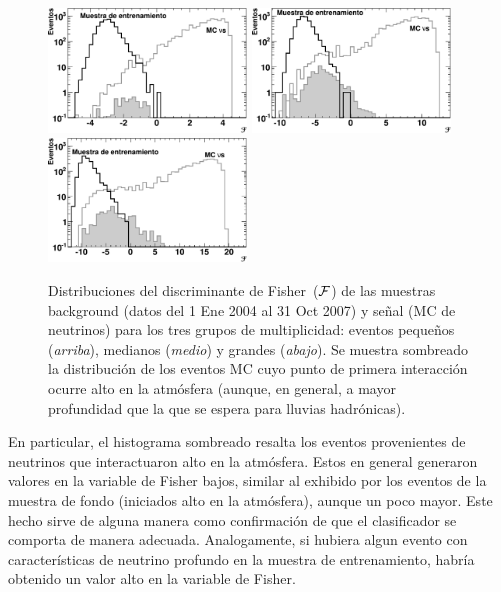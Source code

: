 	\begin{figure}
	\begin{center}
	\includegraphics [width=0.47\textwidth]{fig/seleccionAuger/fishDist_altos_1.pdf}\hfill
	\includegraphics [width=0.47\textwidth]{fig/seleccionAuger/fishDist_altos_2.pdf}\\
	\includegraphics [width=0.47\textwidth]{fig/seleccionAuger/fishDist_altos_3.pdf}
	\end{center}
	\caption{
	Distribuciones del discriminante de Fisher~($\cal{F}$) de las muestras background (datos del 1 Ene 2004 al 31 Oct 2007) y señal (MC de neutrinos) para los tres grupos de multiplicidad: eventos pequeños (\textit{arriba}), medianos (\textit{medio}) y grandes (\textit{abajo}). Se muestra sombreado la distribución de los eventos MC cuyo punto de primera interacción ocurre alto en la atmósfera (aunque, en general, a mayor profundidad que la que se espera para lluvias hadrónicas).
	}
	\label{fig:fisherDGH}
	\end{figure}
	En particular, el histograma sombreado resalta los eventos provenientes de neutrinos que interactuaron alto en la atmósfera.
	Estos en general generaron valores en la variable de Fisher bajos, similar al exhibido por los eventos de la muestra de fondo (iniciados alto en la atmósfera), aunque un poco mayor.
	Este hecho sirve de alguna manera como confirmación de que el clasificador se comporta de manera adecuada. 
	Analogamente, si hubiera algun evento con características de neutrino profundo en la muestra de entrenamiento, habría obtenido un valor alto en la variable de Fisher.
	
